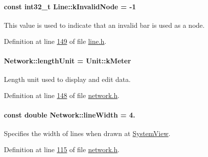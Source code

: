 \hypertarget{group___models_gadc334bd07c6126abc56e531d7e3e72b4}{}
\paragraph[{k\+Invalid\+Node}]{\setlength{\rightskip}{0pt plus 5cm}const int32\+\_\+t Line\+::k\+Invalid\+Node = -\/1\hspace{0.3cm}{\ttfamily [static]}}\label{group___models_gadc334bd07c6126abc56e531d7e3e72b4}
This value is used to indicate that an invalid bar is used as a node. 

Definition at line \hyperlink{line_8h_source_l00149}{149} of file \hyperlink{line_8h_source}{line.\+h}.

\hypertarget{group___models_gae46c0e2bf39b343875e3c69066fe2652}{}
\paragraph[{length\+Unit}]{ Network\+::length\+Unit = {\bf Unit\+::k\+Meter}\hspace{0.3cm}{\ttfamily [static]}}\label{group___models_gae46c0e2bf39b343875e3c69066fe2652}
Length unit used to display and edit data. 

Definition at line \hyperlink{network_8h_source_l00148}{148} of file \hyperlink{network_8h_source}{network.\+h}.

\hypertarget{group___models_ga3f810634c9908d62d33a1ab09a76c147}{}
\paragraph[{line\+Width}]{\setlength{\rightskip}{0pt plus 5cm}const double Network\+::line\+Width = 4.\hspace{0.3cm}{\ttfamily [static]}}\label{group___models_ga3f810634c9908d62d33a1ab09a76c147}
Specifies the width of lines when drawn at \hyperlink{class_system_view}{System\+View}. 

Definition at line \hyperlink{network_8h_source_l00115}{115} of file \hyperlink{network_8h_source}{network.\+h}.

\hypertarget{group___models_ga318dee060bc577eacd67d332efbbe1b2}{}
